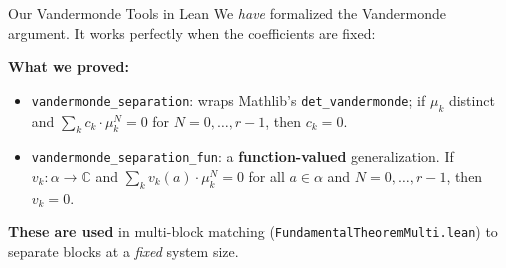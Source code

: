 \documentclass[aspectratio=169,10pt]{beamer}
\begin{document}
\begin{frame}{Our Vandermonde Tools in Lean}
\vspace{-0.3em}
{\small We \emph{have} formalized the Vandermonde argument. It works perfectly when the coefficients are fixed:}

\vspace{0.3em}
{\small\textbf{\textcolor{leangreen}{What we proved:}}}
\begin{itemize}
  \item {\small \texttt{vandermonde\_separation}: wraps Mathlib's \texttt{det\_vandermonde}; if $\mu_k$ distinct and $\sum_k c_k \cdot \mu_k^N = 0$ for $N = 0, \dots, r{-}1$, then $c_k = 0$.}
  \item {\small \texttt{vandermonde\_separation\_fun}: a \textbf{function-valued} generalization. If $v_k : \alpha \to \mathbb{C}$ and $\sum_k v_k(a) \cdot \mu_k^N = 0$ for all $a \in \alpha$ and $N = 0, \dots, r{-}1$, then $v_k = 0$.}
\end{itemize}

\vspace{0.3em}
{\small\textbf{\textcolor{leangreen}{These are used}} in multi-block matching (\texttt{FundamentalTheoremMulti.lean}) to separate blocks at a \emph{fixed} system size.}

\vspace{0.5em}
\begin{center}
\end{center}
\end{frame}
\end{document}
